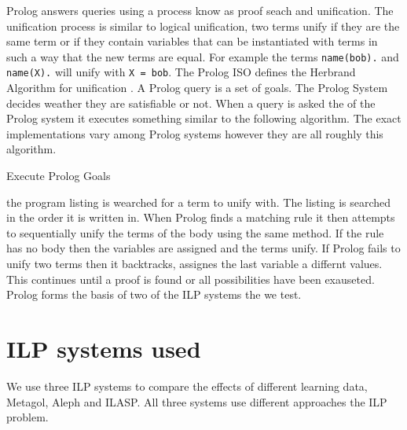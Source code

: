 Prolog answers queries using a process know as proof seach and unification. The unification process is similar to logical unification, two terms unify if they are the same term or if they contain variables that can be instantiated with terms in such a way that the new terms are equal. For example the terms \texttt{name(bob).} and \texttt{name(X).} will unify with \texttt{X = bob}. The Prolog ISO defines the Herbrand Algorithm for unification \cite{PrologISO}. A Prolog query is a set of goals. The Prolog System decides weather they are satisfiable or not. When a query is asked the of the Prolog system it executes something similar to the following algorithm. The exact implementations vary among Prolog systems however they are all roughly this algorithm.
\begin{algorithm}
	\caption{Execute Prolog Goals}
\end{algorithm}

the program listing is wearched for a term to unify with. The listing is searched in the order it is written in. When Prolog finds a matching rule it then attempts to sequentially unify the terms of the body using the same method. If the rule has no body then the variables are assigned and the terms unify. If Prolog fails to unify two terms then it backtracks, assignes the last variable a differnt values. This continues until a proof is found or all possibilities have been exauseted\cite{Bratko}. Prolog forms the basis of two of the ILP systems the we test.

\section{ILP systems used}
We use three ILP systems to compare the effects of different learning data, Metagol, Aleph and ILASP. All three systems use different approaches the ILP problem.
